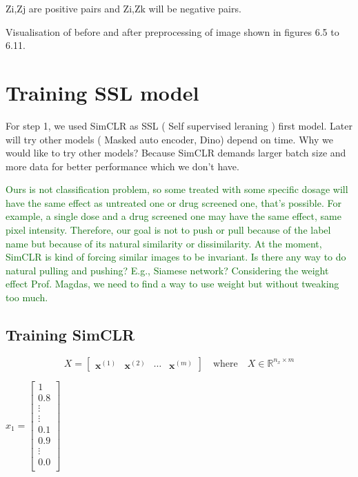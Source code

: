 \documentclass[12pt,twoside,a4paper,parskip]{scrbook} %
\begin{document}
Zi,Zj are positive pairs and Zi,Zk will be negative pairs.


Visualisation of before and after preprocessing of image shown in figures 6.5 to 6.11.

\section{Training SSL model}

For step 1, we used SimCLR as SSL ( Self supervised leraning ) first model. Later will try other models ( Masked auto encoder, Dino) depend on time. 
Why we would like to try other models? Because SimCLR demands larger batch size and more data for better performance which we don't have.

\textcolor{darkgreen}{Ours is not classification problem, so some treated with some specific dosage will have the same effect as untreated one or drug screened one, that's possible. For example, a single dose and a drug screened one may have the same effect, same pixel intensity. Therefore, our goal is not to push or pull because of the label name but because of its natural similarity or dissimilarity. At the moment, SimCLR is kind of forcing similar images to be invariant. Is there any way to do natural pulling and pushing? E.g., Siamese network? Considering the weight effect Prof. Magdas, we need to find a way to use weight but without tweaking too much.}


\subsection{Training SimCLR}



\[
X = \begin{bmatrix}
  \mathbf{x}^{(1)} & \mathbf{x}^{(2)} & \cdots & \mathbf{x}^{(m)}
\end{bmatrix}
\quad \text{where} \quad X \in \mathbb{R}^{n_x \times m}
\]




\( x_1 =\left[\begin{array}{c}1 \\ 0.8 \\ \vdots \\ \vdots \\ 0.1 \\ 0.9 \\ \vdots\\ 0.0 \\\end{array}\right] \)
\end{document}
